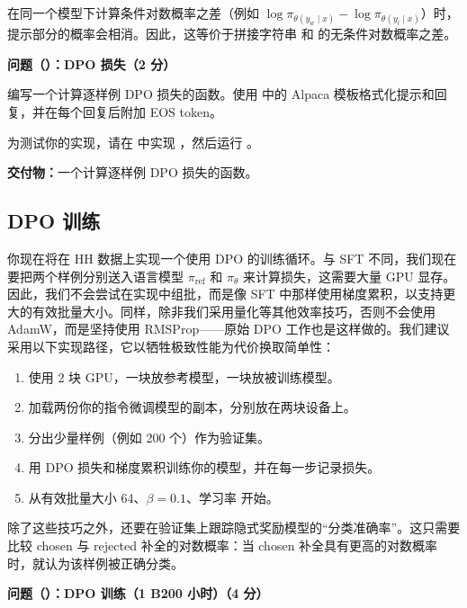 在同一个模型下计算条件对数概率之差（例如 $\log \pi_{\theta(y_w \mid x)} - \log \pi_{\theta(y_l \mid x)}$）时，提示部分的概率会相消。因此，这等价于拼接字符串  和  的无条件对数概率之差。

\medskip
\noindent\textbf{问题（）：DPO 损失（2 分）}
\medskip

编写一个计算逐样例 DPO 损失的函数。使用  中的 Alpaca 模板格式化提示和回复，并在每个回复后附加 EOS token。

为测试你的实现，请在  中实现 ，然后运行 。

\textbf{交付物：}一个计算逐样例 DPO 损失的函数。

\subsection{DPO 训练}

你现在将在 HH 数据上实现一个使用 DPO 的训练循环。与 SFT 不同，我们现在要把两个样例分别送入语言模型 $\pi_{\mathrm{ref}}$ 和 $\pi_\theta$ 来计算损失，这需要大量 GPU 显存。因此，我们不会尝试在实现中组批，而是像 SFT 中那样使用梯度累积，以支持更大的有效批量大小。同样，除非我们采用量化等其他效率技巧，否则不会使用 AdamW，而是坚持使用 RMSProp——原始 DPO 工作也是这样做的。我们建议采用以下实现路径，它以牺牲极致性能为代价换取简单性：
\begin{enumerate}
  \item 使用 2 块 GPU，一块放参考模型，一块放被训练模型。
  \item 加载两份你的指令微调模型的副本，分别放在两块设备上。
  \item 分出少量样例（例如 200 个）作为验证集。
  \item 用 DPO 损失和梯度累积训练你的模型，并在每一步记录损失。
  \item 从有效批量大小 64、$\beta = 0.1$、学习率  开始。
\end{enumerate}

除了这些技巧之外，还要在验证集上跟踪隐式奖励模型的“分类准确率”。这只需要比较 chosen 与 rejected 补全的对数概率：当 chosen 补全具有更高的对数概率时，就认为该样例被正确分类。

\medskip
\noindent\textbf{问题（）：DPO 训练（1 B200 小时）（4 分）}
\medskip


